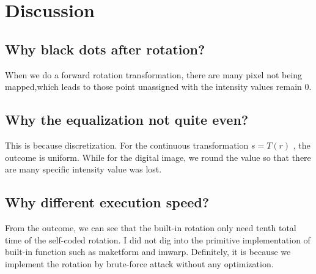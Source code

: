 \documentclass[14pt]{article}
\begin{document}
	\section{Discussion}
	\subsection{Why black dots after rotation?}
	When we do a forward rotation transformation, there are many pixel not being mapped,which leads to those point unassigned with the intensity values remain 0.
	\subsection{Why the equalization not quite even?}
	This is because discretization. For the continuous transformation $ s=T(r)$ , the outcome is uniform. While for the digital image, we round the value so that there are many specific intensity value was lost.
	\subsection{Why different execution speed?}	
	From the outcome, we can see that the built-in rotation only need tenth total time of the self-coded rotation. I did not dig into the primitive implementation of built-in function such as maketform and imwarp. Definitely, it is because we implement the rotation by brute-force attack without any optimization. 
\end{document}
